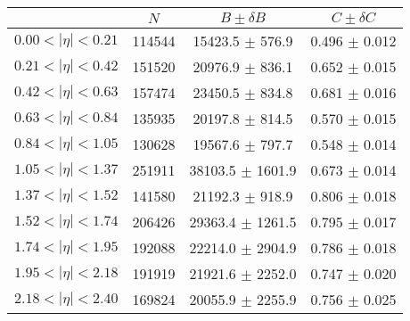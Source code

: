 \begin{tabular}{lccc}
\hline
    &   $N$   & $B \pm \delta B$  &  $C \pm \delta C$ \\
\hline
$0.00 < |\eta| <0.21$          & 114544     & 15423.5    $\pm$ 576.9 & 0.496      $\pm$ 0.012 \\
$0.21 < |\eta| <0.42$          & 151520     & 20976.9    $\pm$ 836.1 & 0.652      $\pm$ 0.015 \\
$0.42 < |\eta| <0.63$          & 157474     & 23450.5    $\pm$ 834.8 & 0.681      $\pm$ 0.016 \\
$0.63 < |\eta| <0.84$          & 135935     & 20197.8    $\pm$ 814.5 & 0.570      $\pm$ 0.015 \\
$0.84 < |\eta| <1.05$          & 130628     & 19567.6    $\pm$ 797.7 & 0.548      $\pm$ 0.014 \\
$1.05 < |\eta| <1.37$          & 251911     & 38103.5    $\pm$ 1601.9 & 0.673      $\pm$ 0.014 \\
$1.37 < |\eta| <1.52$          & 141580     & 21192.3    $\pm$ 918.9 & 0.806      $\pm$ 0.018 \\
$1.52 < |\eta| <1.74$          & 206426     & 29363.4    $\pm$ 1261.5 & 0.795      $\pm$ 0.017 \\
$1.74 < |\eta| <1.95$          & 192088     & 22214.0    $\pm$ 2904.9 & 0.786      $\pm$ 0.018 \\
$1.95 < |\eta| <2.18$          & 191919     & 21921.6    $\pm$ 2252.0 & 0.747      $\pm$ 0.020 \\
$2.18 < |\eta| <2.40$          & 169824     & 20055.9    $\pm$ 2255.9 & 0.756      $\pm$ 0.025 \\
\hline
\end{tabular}
